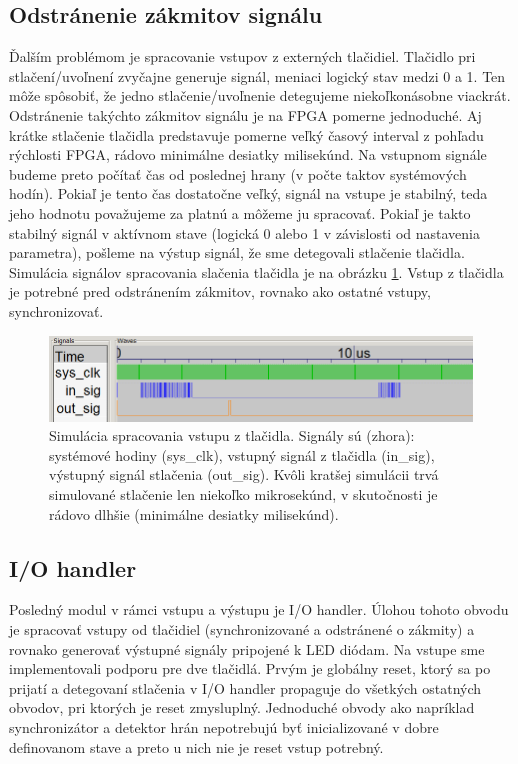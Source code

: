 \subsection{Odstránenie zákmitov signálu} \label{subsek:debouncer}
Ďalším problémom je spracovanie vstupov z externých tlačidiel. Tlačidlo pri stlačení/uvoľnení zvyčajne generuje  signál, meniaci logický stav medzi 0 a 1. Ten môže spôsobiť, že jedno stlačenie/uvoľnenie detegujeme niekoľkonásobne viackrát. Odstránenie takýchto zákmitov signálu je na FPGA pomerne jednoduché. Aj krátke stlačenie tlačidla predstavuje pomerne veľký časový interval z pohľadu rýchlosti FPGA, rádovo minimálne desiatky milisekúnd. Na vstupnom signále budeme preto počítať čas od poslednej hrany (v počte taktov systémových hodín). Pokiaľ je tento čas dostatočne veľký, signál na vstupe je stabilný, teda jeho hodnotu považujeme za platnú a môžeme ju spracovať. Pokiaľ je takto stabilný signál v aktívnom stave (logická 0 alebo 1 v závislosti od nastavenia parametra), pošleme na výstup signál, že sme detegovali stlačenie tlačidla. Simulácia signálov spracovania slačenia tlačidla je na obrázku \ref{obr:debouncerSim}. Vstup z tlačidla je potrebné pred odstránením zákmitov, rovnako ako ostatné vstupy, synchronizovať.

\begin{figure}
    \centerline{\includegraphics[width=1\textwidth]{images/simulations/debouncerSim.png}}
    \caption[Simulácia spracovania vstupu z tlačidla]{Simulácia spracovania vstupu z tlačidla. Signály sú (zhora): systémové hodiny (sys\_clk), vstupný signál z tlačidla (in\_sig), výstupný signál stlačenia (out\_sig). Kvôli kratšej simulácii trvá simulované stlačenie len niekoľko mikrosekúnd, v skutočnosti je rádovo dlhšie (minimálne desiatky milisekúnd).}
    \label{obr:debouncerSim}
\end{figure}

\subsection{I/O handler}
Posledný modul v rámci vstupu a výstupu je I/O handler. Úlohou tohoto obvodu je spracovať vstupy od tlačidiel (synchronizované a odstránené o zákmity) a rovnako generovať výstupné signály pripojené k LED diódam. Na vstupe sme implementovali podporu pre dve tlačidlá. Prvým je globálny reset, ktorý sa po prijatí a detegovaní stlačenia v I/O handler propaguje do všetkých ostatných obvodov, pri ktorých je reset zmysluplný. Jednoduché obvody ako napríklad synchronizátor a detektor hrán nepotrebujú byť inicializované v dobre definovanom stave a preto u nich nie je reset vstup potrebný.

